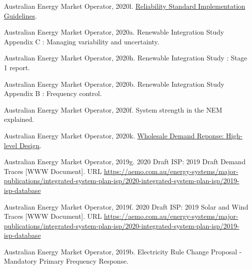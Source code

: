 \documentclass[12pt,a4paper,]{report}
\newlength{\cslhangindent}
\newenvironment{CSLReferences}[2] %
 {%
  \setlength{\parindent}{0pt}
  \ifodd #1 \everypar{\setlength{\hangindent}{\cslhangindent}}\ignorespaces\fi
  \ifnum #2 > 0
  \setlength{\parskip}{#2\baselineskip}
  \fi
 }%
 {}
\begin{document}
\begin{CSLReferences}{1}{0}
\leavevmode{}%
Australian Energy Market Operator, 2020l.
\href{https://aemo.com.au/-/media/files/electricity/nem/planning_and_forecasting/rsig/reliability-standard-implementation-guidelines.pdf?la=en}{Reliability
{Standard Implementation Guidelines}}.

\leavevmode{}%
Australian Energy Market Operator, 2020a. Renewable {Integration Study
Appendix C} : {Managing} variability and uncertainty.

\leavevmode{}%
Australian Energy Market Operator, 2020h. Renewable {Integration Study}
: {Stage} 1 report.

\leavevmode{}%
Australian Energy Market Operator, 2020b. Renewable {Integration Study
Appendix B} : {Frequency} control.

\leavevmode{}%
Australian Energy Market Operator, 2020f. System strength in the {NEM}
explained.

\leavevmode{}%
Australian Energy Market Operator, 2020k.
\href{https://www.aemo.com.au/-/media/files/initiatives/submissions/2020/wdrm/wdrm-high-level-design-june-2020.pdf}{Wholesale
{Demand Reponse}: {High-level Design}}.

\leavevmode{}%
Australian Energy Market Operator, 2019g. 2020 {Draft ISP}: 2019 {Draft
Demand Traces} {[}WWW Document{]}. URL
\url{https://aemo.com.au/energy-systems/major-publications/integrated-system-plan-isp/2020-integrated-system-plan-isp/2019-isp-database}

\leavevmode{}%
Australian Energy Market Operator, 2019f. 2020 {Draft ISP}: 2019 {Solar}
and {Wind Traces} {[}WWW Document{]}. URL
\url{https://aemo.com.au/energy-systems/major-publications/integrated-system-plan-isp/2020-integrated-system-plan-isp/2019-isp-database}

\leavevmode{}%
Australian Energy Market Operator, 2019b. Electricity {Rule Change
Proposal} - {Mandatory Primary Frequency Response}.


\end{CSLReferences}
\end{document}
